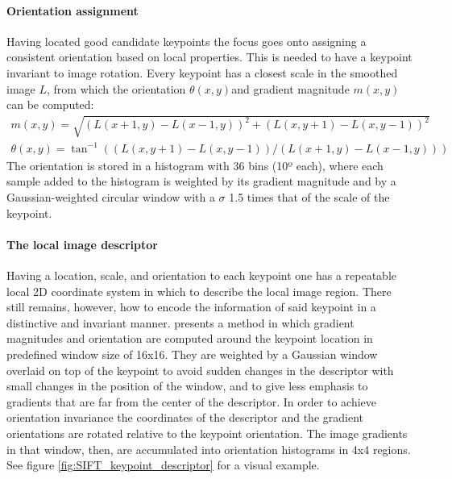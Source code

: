 \documentclass[../main.tex]{subfiles}
\begin{document}
\paragraph{Orientation assignment} Having located good candidate keypoints the focus goes onto assigning a consistent orientation based on local properties. This is needed to have a keypoint invariant to image rotation. Every keypoint has a closest scale in the smoothed image $L$, from which the orientation $\theta(x,y)$and gradient magnitude $m(x,y)$ can be computed:
\begin{equation}
    \begin{array}{l}
    m(x, y)=\sqrt{(L(x+1, y)-L(x-1, y))^{2}+(L(x, y+1)-L(x, y-1))^{2}} \\
    \theta(x, y)=\tan ^{-1}((L(x, y+1)-L(x, y-1)) /(L(x+1, y)-L(x-1, y)))
    \end{array}
\end{equation}
The orientation is stored in a histogram with 36 bins (10º each), where each sample added to the histogram is weighted by its gradient magnitude and by a Gaussian-weighted circular window with a $\sigma$ 1.5 times that of the scale of the keypoint.

\paragraph{The local image descriptor}
Having a location, scale, and orientation to each keypoint one has a repeatable local 2D coordinate system in which to describe the local image region. There still remains, however, how to encode the information of said keypoint in a distinctive and invariant manner. \cite{SIFTlowe2004} presents a method in which gradient magnitudes and orientation are computed around the keypoint location in predefined window size of 16x16. They are weighted by a Gaussian window overlaid on top of the keypoint to avoid sudden changes in the descriptor with small changes in the position of the window, and to give less emphasis to gradients that are far from the center of the descriptor. In order to achieve orientation invariance the coordinates of the descriptor and the gradient orientations are rotated relative to the keypoint orientation. The image gradients in that window, then, are accumulated into orientation histograms in 4x4 regions. See figure \ref{fig:SIFT_keypoint_descriptor} for a visual example. 
\end{document}
